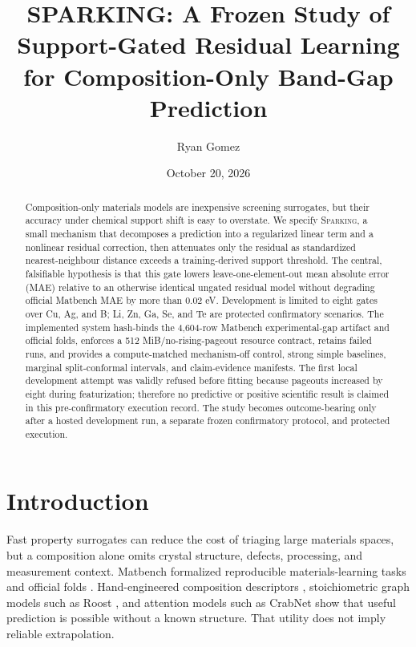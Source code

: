 \documentclass[11pt]{article}
\title{SPARKING: A Frozen Study of Support-Gated Residual Learning\\for Composition-Only Band-Gap Prediction}
\author{Ryan Gomez}
\date{October 20, 2026}
\newcommand{\method}{\textsc{Sparking}}
\begin{document}
\maketitle

\begin{abstract}
Composition-only materials models are inexpensive screening surrogates, but
their accuracy under chemical support shift is easy to overstate. We specify
\method{}, a small mechanism that decomposes a prediction into a regularized
linear term and a nonlinear residual correction, then attenuates only the
residual as standardized nearest-neighbour distance exceeds a training-derived
support threshold. The central, falsifiable hypothesis is that this gate lowers
leave-one-element-out mean absolute error (MAE) relative to an otherwise
identical ungated residual model without degrading official Matbench MAE by
more than 0.02 eV. Development is limited to eight gates over Cu, Ag, and B;
Li, Zn, Ga, Se, and Te are protected confirmatory scenarios. The implemented
system hash-binds the 4,604-row Matbench experimental-gap artifact and official
folds, enforces a 512 MiB/no-rising-pageout resource contract, retains failed
runs, and provides a compute-matched mechanism-off control, strong simple
baselines, marginal split-conformal intervals, and claim-evidence manifests.
The first local development attempt was validly refused before fitting because
pageouts increased by eight during featurization; therefore no predictive or
positive scientific result is claimed in this pre-confirmatory execution
record. The study becomes outcome-bearing only after a hosted development run,
a separate frozen confirmatory protocol, and protected execution.
\end{abstract}

\section{Introduction}
Fast property surrogates can reduce the cost of triaging large materials spaces,
but a composition alone omits crystal structure, defects, processing, and
measurement context. Matbench formalized reproducible materials-learning tasks
and official folds \citep{dunn2020matbench}. Hand-engineered composition
descriptors \citep{ward2016magpie}, stoichiometric graph models such as Roost
\citep{goodall2020roost}, and attention models such as CrabNet
\citep{wang2021crabnet} show that useful prediction is possible without a known
structure. That utility does not imply reliable extrapolation.
\end{document}
